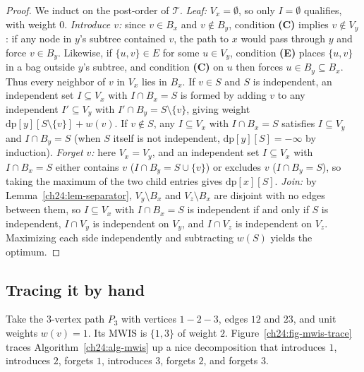 \begin{proof}
We induct on the post-order of $\mathcal{T}$.
\emph{Leaf:} $V_x=\emptyset$, so only $I=\emptyset$ qualifies, with weight $0$.
\emph{Introduce $v$:} since $v\in B_x$ and $v\notin B_y$, condition \textbf{(C)}
implies $v\notin V_y$: if any node in $y$'s subtree contained $v$, the path to $x$
would pass through $y$ and force $v\in B_y$. Likewise, if $\{u,v\}\in E$ for some
$u\in V_y$, condition \textbf{(E)} places $\{u,v\}$ in a bag outside $y$'s subtree,
and condition \textbf{(C)} on $u$ then forces $u\in B_y\subseteq B_x$. Thus every
neighbor of $v$ in $V_x$ lies in $B_x$. If $v\in S$ and $S$ is independent, an
independent set $I\subseteq V_x$ with $I\cap B_x=S$ is formed by adding $v$ to any
independent $I'\subseteq V_y$ with $I'\cap B_y=S\setminus\{v\}$, giving weight
$\mathrm{dp}[y][S\setminus\{v\}]+w(v)$. If $v\notin S$, any $I\subseteq V_x$ with
$I\cap B_x=S$ satisfies $I\subseteq V_y$ and $I\cap B_y=S$ (when $S$ itself is not
independent, $\mathrm{dp}[y][S]=-\infty$ by induction).
\emph{Forget $v$:} here $V_x=V_y$, and an independent set $I\subseteq V_x$ with
$I\cap B_x=S$ either contains $v$ ($I\cap B_y=S\cup\{v\}$) or excludes $v$
($I\cap B_y=S$), so taking the maximum of the two child entries gives
$\mathrm{dp}[x][S]$.
\emph{Join:} by Lemma~\ref{ch24:lem-separator}, $V_y\setminus B_x$ and
$V_z\setminus B_x$ are disjoint with no edges between them, so $I\subseteq V_x$
with $I\cap B_x=S$ is independent if and only if $S$ is independent, $I\cap V_y$ is
independent on $V_y$, and $I\cap V_z$ is independent on $V_z$. Maximizing each side
independently and subtracting $w(S)$ yields the optimum.
\end{proof}

\subsection{Tracing it by hand}

Take the $3$-vertex path $P_3$ with vertices $1-2-3$, edges $12$ and $23$, and unit
weights $w(v)=1$. Its MWIS is $\{1,3\}$ of weight $2$. Figure~\ref{ch24:fig-mwis-trace}
traces Algorithm~\ref{ch24:alg-mwis} up a nice decomposition that introduces $1$,
introduces $2$, forgets $1$, introduces $3$, forgets $2$, and forgets $3$.

